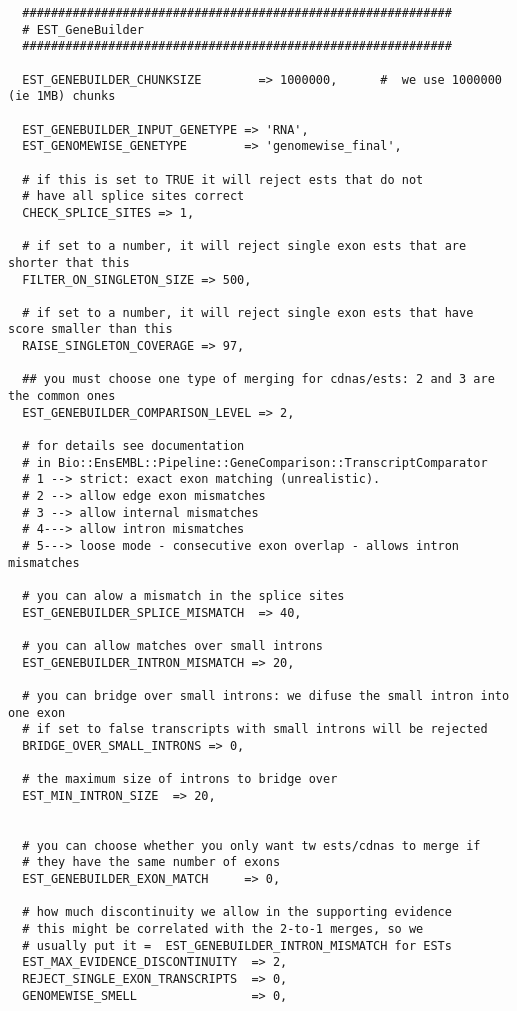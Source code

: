 \documentclass[a4paper,10pt]{article}
\begin{document}
\begin{verbatim}
  ############################################################
  # EST_GeneBuilder
  ############################################################
  
  EST_GENEBUILDER_CHUNKSIZE        => 1000000,      #  we use 1000000 (ie 1MB) chunks
  
  EST_GENEBUILDER_INPUT_GENETYPE => 'RNA',
  EST_GENOMEWISE_GENETYPE        => 'genomewise_final',
  
  # if this is set to TRUE it will reject ests that do not
  # have all splice sites correct
  CHECK_SPLICE_SITES => 1,
  
  # if set to a number, it will reject single exon ests that are shorter that this
  FILTER_ON_SINGLETON_SIZE => 500,
  
  # if set to a number, it will reject single exon ests that have score smaller than this
  RAISE_SINGLETON_COVERAGE => 97,
  
  ## you must choose one type of merging for cdnas/ests: 2 and 3 are the common ones
  EST_GENEBUILDER_COMPARISON_LEVEL => 2,
  
  # for details see documentation 
  # in Bio::EnsEMBL::Pipeline::GeneComparison::TranscriptComparator
  # 1 --> strict: exact exon matching (unrealistic). 
  # 2 --> allow edge exon mismatches
  # 3 --> allow internal mismatches
  # 4---> allow intron mismatches
  # 5---> loose mode - consecutive exon overlap - allows intron mismatches
  
  # you can alow a mismatch in the splice sites
  EST_GENEBUILDER_SPLICE_MISMATCH  => 40,
  
  # you can allow matches over small introns 
  EST_GENEBUILDER_INTRON_MISMATCH => 20,
  
  # you can bridge over small introns: we difuse the small intron into one exon
  # if set to false transcripts with small introns will be rejected
  BRIDGE_OVER_SMALL_INTRONS => 0,
  
  # the maximum size of introns to bridge over
  EST_MIN_INTRON_SIZE  => 20,
  
  
  # you can choose whether you only want tw ests/cdnas to merge if
  # they have the same number of exons
  EST_GENEBUILDER_EXON_MATCH     => 0,
  
  # how much discontinuity we allow in the supporting evidence
  # this might be correlated with the 2-to-1 merges, so we
  # usually put it =  EST_GENEBUILDER_INTRON_MISMATCH for ESTs
  EST_MAX_EVIDENCE_DISCONTINUITY  => 2,
  REJECT_SINGLE_EXON_TRANSCRIPTS  => 0,
  GENOMEWISE_SMELL                => 0,
  

\end{verbatim}
\end{document}
